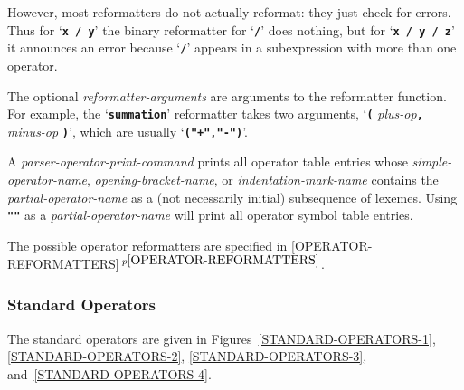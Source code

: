 \documentclass[12pt]{article}
\newcommand{\TT}[1]{{\tt \bfseries #1}}
\newcommand{\itemref}[1]{\ref{#1}$\,^{p\pageref{#1}}$}
\begin{document}
However, most reformatters do not actually reformat: they just check
for errors.  Thus for `\TT{x / y}' the binary reformatter for `\TT{/}'
does nothing, but for `\TT{x / y / z}' it announces an error because
`\TT{/}' appears in a subexpression with more than one operator.

The optional {\em reformatter-arguments} are arguments to the reformatter
function.  For example, the `\TT{summation}' reformatter takes two
arguments, `\TT{(} {\em plus-op}\TT{,} {\em minus-op} \TT{)}', which
are usually `\TT{("+","-")}'.

A {\em parser-operator-print-command}
prints all operator table entries whose
{\em simple-operator-name},
{\em opening-bracket-name}, or
{\em indentation-mark-name}
contains the {\em partial-operator-name}
as a (not necessarily initial) subsequence of lexemes.  Using \TT{""} as
a {\em partial-operator-name} will print all operator
symbol table entries.

The possible operator reformatters are specified
in \itemref{OPERATOR-REFORMATTERS}.

\subsubsection{Standard Operators}
\label{STANDARD-OPERATORS}

The standard operators are given in Figures~\ref{STANDARD-OPERATORS-1},
\ref{STANDARD-OPERATORS-2},
\ref{STANDARD-OPERATORS-3},
and~\ref{STANDARD-OPERATORS-4}.
\end{document}
